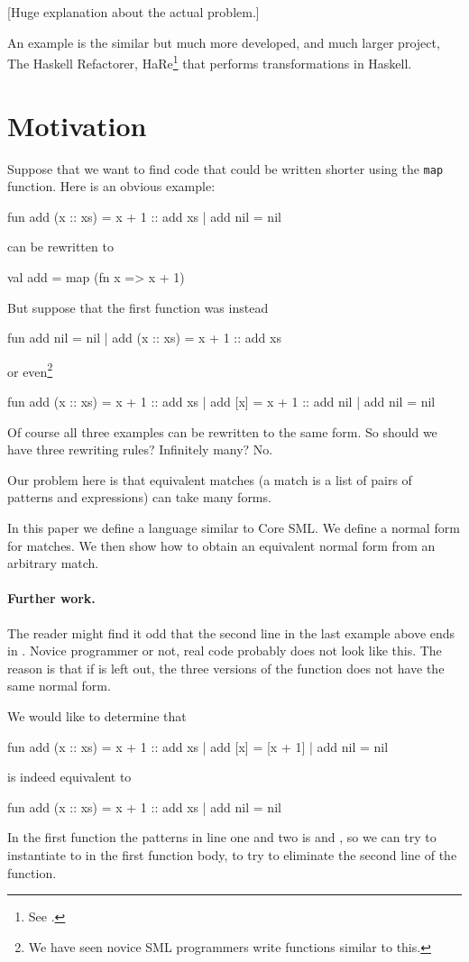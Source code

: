 {\footnotesize [Huge explanation about the actual problem.]}

An example is the similar but much more developed, and much larger project, The
Haskell Refactorer, HaRe\footnote{See \cite{HARE}.} that performs
transformations in Haskell. 


\section{Motivation}
\label{sec:motivation}
Suppose that we want to find code that could be written shorter using the
\texttt{map} function.
Here is an obvious example:
\begin{sml}
fun add (x :: xs) = x + 1 :: add xs
  | add nil       = nil
\end{sml}
can be rewritten to
\begin{sml}
val add = map (fn x => x + 1)
\end{sml}

But suppose that the first function was instead
\begin{sml}
fun add nil       = nil
  | add (x :: xs) = x + 1 :: add xs
\end{sml}
or even\footnote{We have seen novice SML programmers write functions similar to
  this.}
\begin{sml}
fun add (x :: xs) = x + 1 :: add xs
  | add [x]       = x + 1 :: add nil
  | add nil       = nil
\end{sml}
Of course all three examples can be rewritten to the same form. So should we
have three rewriting rules? Infinitely many? No.

Our problem here is that equivalent matches (a match is a list of pairs of
patterns and expressions) can take many forms.

In this paper we define a language similar to Core SML. We define a
normal form for matches. We then show how to obtain an equivalent normal form
from an arbitrary match.

\paragraph{Further work.}
The reader might find it odd that the second line in the last example above ends
in . Novice programmer or not, real code probably does not
look like this. The reason is that if  is left out, the three
versions of the function  does not have the same normal form.

We would like to determine that
\begin{sml}
fun add (x :: xs) = x + 1 :: add xs
  | add [x]       = [x + 1]
  | add nil       = nil
\end{sml}
is indeed equivalent to
\begin{sml}
fun add (x :: xs) = x + 1 :: add xs
  | add nil       = nil
\end{sml}
In the first function the patterns in line one and two is 
and , so we can try to instantiate  to
 in the first function body, to try to eliminate the second line
of the function.

